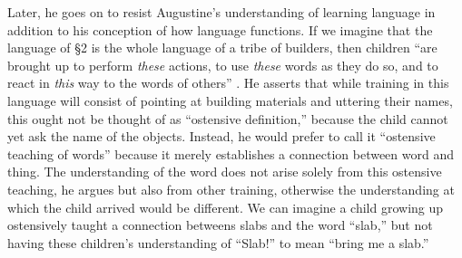 \documentclass[man,12pt,natbib]{apa6}
\begin{document}
Later, he goes on to resist Augustine's understanding of learning language 
in addition to his conception of how language functions. If we imagine that the
language of \S 2 is the whole language of a tribe of builders, then children
``are brought up to perform \emph{these} actions, to use \emph{these} words
as they do so, and to react in \emph{this} way to the words of others''
\cite[\S 6]{Wittgenstein53}. He asserts that while training in this language
will consist of pointing at building materials and uttering their names, this
ought not be thought of as ``ostensive definition,'' because the child cannot
yet ask the name of the objects. Instead, he would prefer to call it
``ostensive teaching of words'' because it merely establishes a connection
between word and thing. The understanding of the word does not arise solely
from this ostensive teaching, he argues but also from other training, otherwise
the understanding at which the child arrived would be different. We can imagine
a child growing up ostensively taught a connection betweens slabs and the word
``slab,'' but not having these children's understanding of ``Slab!'' to
mean ``bring me a slab.''
\end{document}
